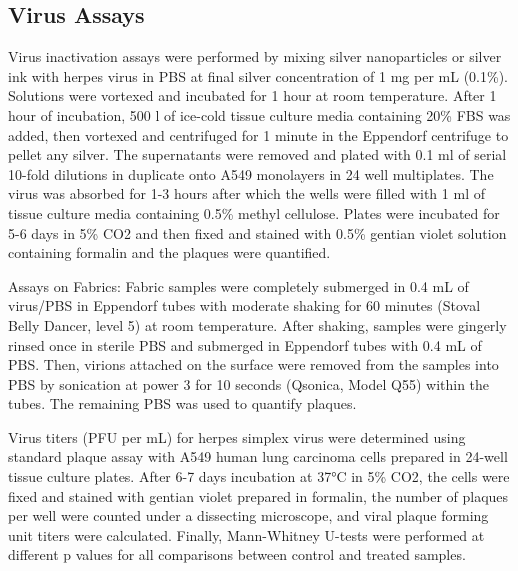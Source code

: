 \documentclass[journal=jacsat,manuscript=article]{achemso}
\begin{document}
\subsection{Virus Assays}
Virus inactivation assays were performed by mixing silver nanoparticles or silver ink with  herpes virus in PBS at final silver concentration of 1 mg per mL (0.1\%). Solutions were vortexed and incubated for 1 hour %
at room temperature. After 1 hour of incubation, 500 \micro l of ice-cold tissue culture media containing 20\% FBS was added, then vortexed and centrifuged for 1 minute in the Eppendorf centrifuge to pellet any silver. The supernatants were removed and plated with 0.1 ml of serial 10-fold dilutions in duplicate onto A549 monolayers in 24 well multiplates. The virus was absorbed for 1-3 hours after which the wells were filled with 1 ml of tissue culture media containing 0.5\% methyl cellulose.  Plates were incubated for 5-6 days in 5\% CO2 and then fixed and stained with 0.5\% gentian violet solution containing formalin and the plaques were quantified.

Assays on Fabrics: Fabric samples were completely submerged in 0.4 mL of virus/PBS in Eppendorf tubes with moderate shaking for 60 minutes (Stoval Belly Dancer, level 5) at room temperature. %
After shaking, samples were gingerly rinsed once in sterile PBS and submerged in Eppendorf tubes with 0.4 mL of PBS. Then, virions attached on the surface were removed from the samples into PBS by sonication at power 3 for 10 seconds (Qsonica, Model Q55) within the tubes. The remaining PBS was used to quantify plaques. 

Virus titers (PFU per mL) for herpes simplex virus were determined using standard plaque assay with A549 human lung carcinoma cells prepared in 24-well tissue culture plates. After 6-7 days incubation at 37°C in 5\% CO2, the cells were fixed and stained with gentian violet prepared in formalin, the number of plaques per well were counted under a dissecting microscope, and viral plaque forming unit titers were calculated. 
Finally, Mann-Whitney U-tests were performed at different p values for all comparisons between control and treated samples.
\end{document}

